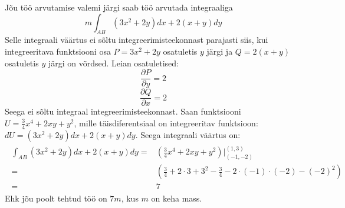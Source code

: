 \documentclass{article}
\begin{document}
Jõu töö arvutamise valemi järgi saab töö arvutada integraaliga $$m\int_{AB} (3x^2+2y)dx+2(x+y)dy$$ Selle integraali väärtus ei sõltu integreerimisteekonnast parajasti siis, kui integreeritava funktsiooni osa $P=3x^2+2y$ osatuletis $y$ järgi ja $Q=2(x+y)$ osatuletis $y$ järgi on võrdsed. Leian osatuletised: $$\frac{\partial P}{\partial y}=2$$$$\frac{\partial Q}{\partial x}=2$$ Seega ei sõltu integraal integreerimisteekonnast. Saan funktsiooni $U=\frac34x^4+2xy+y^2$, mille täisdiferentsiaal on integreeritav funktsioon: $dU=(3x^2+2y)dx+2(x+y)dy$. Seega integraali väärtus on: 
\begin{gather*}
\begin{aligned}
\int_{AB} (3x^2+2y)dx+2(x+y)dy=&\left(\frac34x^4+2xy+y^2\right)\Bigg|_{(-1,-2)}^{(1,3)}\\
=&\left(\frac34+2\cdot3+3^2-\frac34-2\cdot(-1)\cdot(-2)-(-2)^2\right)\\
=&7
\end{aligned}
\end{gather*}
Ehk jõu poolt tehtud töö on $7m$, kus $m$ on keha mass.
\end{document}
